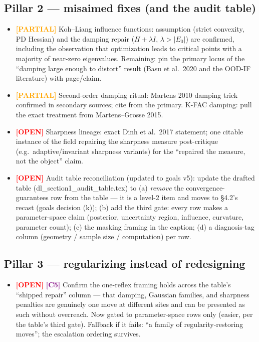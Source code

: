 \documentclass[11pt]{article}
\newcommand{\open}{\textcolor{red}{\textbf{[OPEN]}} }
\newcommand{\partialr}{\textcolor{orange}{\textbf{[PARTIAL]}} }
\newcommand{\cref}[1]{\textcolor{purple}{\textbf{[#1]}} }
\begin{document}
\subsection*{Pillar 2 --- misaimed fixes (and the audit table)}
\begin{itemize}[itemsep=4pt]
\item \partialr Koh--Liang influence functions: assumption (strict
convexity, PD Hessian) and the damping repair ($H+\lambda I$, $\lambda >
|E_0|$) are confirmed, including the observation that optimization leads
to critical points with a majority of near-zero eigenvalues. Remaining:
pin the primary locus of the ``damping large enough to distort'' result
(Basu et al.\ 2020 and the OOD-IF literature) with page/claim.
\item \partialr Second-order damping ritual: Martens 2010 damping trick
confirmed in secondary sources; cite from the primary. K-FAC damping:
pull the exact treatment from Martens--Grosse 2015.
\item \open Sharpness lineage: exact Dinh et al.\ 2017 statement; one
citable instance of the field repairing the sharpness measure
post-critique (e.g.\ adaptive/invariant sharpness variants) for the
``repaired the measure, not the object'' claim.
\item \open Audit table reconciliation (updated to goals v5): update the
drafted table (dl\_section1\_audit\_table.tex) to (a) \emph{remove} the
convergence-guarantees row from the table --- it is a level-2 item and
moves to \S4.2's recast (goals decision (k)); (b) add the third gate:
every row makes a parameter-space claim (posterior, uncertainty region,
influence, curvature, parameter count); (c) the masking framing in the
caption; (d) a diagnosis-tag column (geometry / sample size /
computation) per row.
\end{itemize}

\subsection*{Pillar 3 --- regularizing instead of redesigning}
\begin{itemize}[itemsep=4pt]
\item \open \cref{C5} Confirm the one-reflex framing holds across the
table's ``shipped repair'' column --- that damping, Gaussian families,
and sharpness penalties are genuinely one move at different sites and
can be presented as such without overreach. Now gated to
parameter-space rows only (easier, per the table's third gate).
Fallback if it fails: ``a family of regularity-restoring moves''; the
escalation ordering survives.
\end{itemize}
\end{document}

